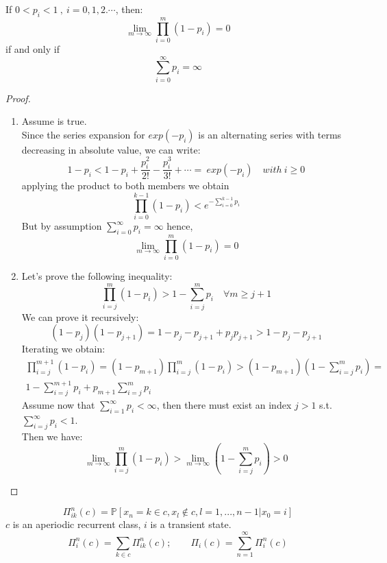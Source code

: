 \begin{lemma}
  If $0 < p_i < 1 ~,~ i=0,1,2.\cdots $, then:
	\begin{equation}\label{limprodpi}
	  \lim_{m \to \infty} \prod_{i=0}^{m}(1-p_i) = 0
	\end{equation}
	if and only if
	\begin{equation}\label{pitoinfty}
	  \sum_{i=0}^\infty p_i = \infty
	\end{equation}
\end{lemma}
\begin{proof}
	\begin{enumerate}
	  \item 	Assume  is true. \\
			Since the series expansion for $exp(-p_i)$ is an alternating series with terms decreasing in absolute value, we can write:
			\begin{equation}
			  1-p_i < 1-p_i + \frac{p_i^2}{2!} - \frac{p_i^3}{3!} + \cdots = ~exp(-p_i) \quad with ~i\ge 0
			\end{equation}
			applying the product to both members we obtain
			\begin{equation}
			  \prod_{i=0}^{k-1} (1-p_i) < e^{-\sum_{i=0}^{k-1}p_i}
			\end{equation}
			But by assumption $\sum_{i=0}^\infty p_i = \infty$ hence,
			$$ \lim_{m \to \infty} \prod_{i=0}^{m}(1-p_i) = 0 $$
		\item Let's prove the following inequality:
		$$ \prod_{i=j}^m(1-p_i) > 1-\sum_{i=j}^m p_i \quad \forall m \ge j+1$$
		We can prove it recursively:
		$$(1-p_j)(1-p_{j+1}) = 1-p_j - p_{j+1} + p_jp_{j+1} > 1-p_j - p_{j+1}$$
		Iterating we obtain:
		\begin{eqnarray*}
		\prod_{i=j}^{m+1}(1-p_i) = (1-p_{m+1})\prod_{i=j}^m(1-p_i) > (1-p_{m+1})(1-\sum_{i=j}^m p_i) = \\
		1- \sum_{i=j}^{m+1} p_i + p_{m+1}\sum_{i=j}^m p_i
		\end{eqnarray*}
		Assume now that $\sum_{i=1}^\infty p_i < \infty$, then there must exist an index $j>1$ s.t. $\sum_{i=j}^\infty p_i < 1$. \\
		Then we have:
		$$ \lim_{m \to \infty} \prod_{i=j}^m (1-p_i) > \lim_{m \to \infty} (1-\sum_{i=j}^m p_i) > 0 $$
	\end{enumerate}
\end{proof}

\begin{definition}[lezione 22/03/17]
$$\Pi_{ik}^n(c) = \mathbb{P}[x_n = k \in c, x_l \notin c, l=1, ... , n-1 | x_0 =i]$$
$c$ is an aperiodic recurrent class, $i$ is a transient state.
$$\Pi_i^n(c) = \sum_{k \in c} \Pi_{ik}^n(c); \qquad \Pi_i(c) = \sum_{n=1}^\infty \Pi_i^n(c)$$
\end{definition}

